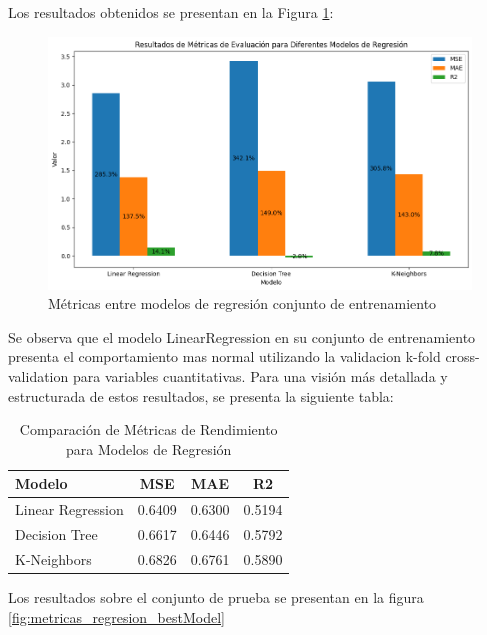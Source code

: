 Los resultados obtenidos se presentan en la Figura \ref{fig:metricas_regresion}:

\begin{figure}[H]
    \centering
    \includegraphics[width=1\textwidth]{img/compara_algoritmos/metricasEntreModelosRegresion.png}
    \caption{Métricas entre modelos de regresión conjunto de entrenamiento}
    \label{fig:metricas_regresion}
\end{figure}

Se observa que el modelo LinearRegression en su conjunto de entrenamiento presenta el comportamiento mas normal utilizando la validacion k-fold cross-validation para variables cuantitativas.
Para una visión más detallada y estructurada de estos resultados, se presenta la siguiente tabla:

\begin{table}[H]
    \centering
    \caption{Comparación de Métricas de Rendimiento para Modelos de Regresión}
    \begin{tabular}{lccc}
        \toprule
        \textbf{Modelo} & \textbf{MSE} & \textbf{MAE} & \textbf{R2 } \\
        \midrule
        Linear Regression & 0.6409 & 0.6300 & 0.5194 \\
        Decision Tree  & 0.6617 & 0.6446 & 0.5792 \\
        K-Neighbors & 0.6826 & 0.6761 & 0.5890 \\
        \bottomrule
    \end{tabular}
    \label{tab:res_metrics}
\end{table}

Los resultados sobre el conjunto de prueba se presentan en la figura \ref{fig:metricas_regresion_bestModel}

